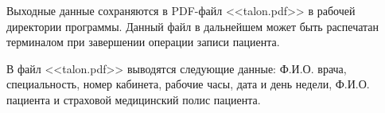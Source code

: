 Выходные данные сохраняются в PDF-файл <<talon.pdf>> в рабочей директории программы. Данный файл в дальнейшем может быть распечатан терминалом при завершении операции записи пациента. 

В файл <<talon.pdf>> выводятся следующие данные: Ф.И.О. врача, специальность, номер кабинета, рабочие часы, дата и день недели, Ф.И.О. пациента и страховой медицинский полис пациента.











